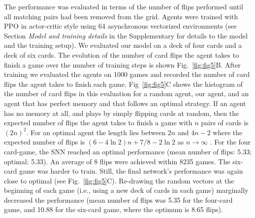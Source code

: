 \documentclass{article}
\begin{document}
The performance was evaluated in terms of the number of flips performed until all matching pairs had been removed from the grid. Agents were trained with \gls{PPO} \cite{schulman2017proximal} in actor-critic style using \num{64} asynchronous vectorized environments (see Section \emph{Model and training details} in the Supplementary for details to the model and the training setup). We evaluated our model on a deck of four cards and a deck of six cards. The evolution of the number of card flips the agent takes to finish a game over the number of training steps is shown Fig.~\ref{fig:fig5}B. After training we evaluated the agents on \num{1000} games and recorded the number of card flips the agent takes to finish each game. Fig~\ref{fig:fig5}C shows the histogram of the number of card flips in this evaluation for a random agent, our agent, and an agent that has perfect memory and that follows an optimal strategy. If an agent has no memory at all, and plays by simply flipping cards at random, then the expected number of flips the agent takes to finish a game with $n$ pairs of cards is $(2n)^2$. For an optimal agent the length lies between $2n$ and $4n - 2$ where the expected number of flips is $(6 - 4\ln{2})n + 7/8 - 2\ln{2}$ as $n \to \infty$ \cite{velleman2013expect}. For the four card-game, the SNN reached an optimal performance (mean number of flips: \num{5.33}; optimal: \num{5.33}). An average of \num{8} flips were achieved within \num{8235} games. The six-card game was harder to train. Still, the final network's performance was again close to optimal (see Fig.~\ref{fig:fig5}C). Re-drawing the random vectors at the beginning of each game (i.e., using a new deck of cards in each game) marginally decreased the performance (mean number of flips was \num{5.35} for the four-card game, and \num{10.88} for the six-card game, where the optimum is \num{8.65} flips).
\end{document}
